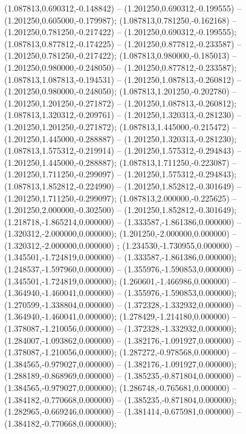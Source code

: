  (1.087813,0.690312,-0.148842) -- (1.201250,0.690312,-0.199555) -- (1.201250,0.605000,-0.179987);
 (1.087813,0.781250,-0.162168) -- (1.201250,0.781250,-0.217422) -- (1.201250,0.690312,-0.199555);
 (1.087813,0.877812,-0.174225) -- (1.201250,0.877812,-0.233587) -- (1.201250,0.781250,-0.217422);
 (1.087813,0.980000,-0.185013) -- (1.201250,0.980000,-0.248050) -- (1.201250,0.877812,-0.233587);
 (1.087813,1.087813,-0.194531) -- (1.201250,1.087813,-0.260812) -- (1.201250,0.980000,-0.248050);
 (1.087813,1.201250,-0.202780) -- (1.201250,1.201250,-0.271872) -- (1.201250,1.087813,-0.260812);
 (1.087813,1.320312,-0.209761) -- (1.201250,1.320313,-0.281230) -- (1.201250,1.201250,-0.271872);
 (1.087813,1.445000,-0.215472) -- (1.201250,1.445000,-0.288887) -- (1.201250,1.320313,-0.281230);
 (1.087813,1.575312,-0.219914) -- (1.201250,1.575312,-0.294843) -- (1.201250,1.445000,-0.288887);
 (1.087813,1.711250,-0.223087) -- (1.201250,1.711250,-0.299097) -- (1.201250,1.575312,-0.294843);
 (1.087813,1.852812,-0.224990) -- (1.201250,1.852812,-0.301649) -- (1.201250,1.711250,-0.299097);
 (1.087813,2.000000,-0.225625) -- (1.201250,2.000000,-0.302500) -- (1.201250,1.852812,-0.301649);
 (1.218718,-1.865214,0.000000) -- (1.333587,-1.861386,0.000000) -- (1.320312,-2.000000,0.000000);
 (1.201250,-2.000000,0.000000) -- (1.320312,-2.000000,0.000000) ;
 (1.234530,-1.730955,0.000000) -- (1.345501,-1.724819,0.000000) -- (1.333587,-1.861386,0.000000);
 (1.248537,-1.597960,0.000000) -- (1.355976,-1.590853,0.000000) -- (1.345501,-1.724819,0.000000);
 (1.260601,-1.466986,0.000000) -- (1.364940,-1.460041,0.000000) -- (1.355976,-1.590853,0.000000);
 (1.270599,-1.338804,0.000000) -- (1.372328,-1.332932,0.000000) -- (1.364940,-1.460041,0.000000);
 (1.278429,-1.214180,0.000000) -- (1.378087,-1.210056,0.000000) -- (1.372328,-1.332932,0.000000);
 (1.284007,-1.093862,0.000000) -- (1.382176,-1.091927,0.000000) -- (1.378087,-1.210056,0.000000);
 (1.287272,-0.978568,0.000000) -- (1.384565,-0.979027,0.000000) -- (1.382176,-1.091927,0.000000);
 (1.288189,-0.868969,0.000000) -- (1.385235,-0.871804,0.000000) -- (1.384565,-0.979027,0.000000);
 (1.286748,-0.765681,0.000000) -- (1.384182,-0.770668,0.000000) -- (1.385235,-0.871804,0.000000);
 (1.282965,-0.669246,0.000000) -- (1.381414,-0.675981,0.000000) -- (1.384182,-0.770668,0.000000);
